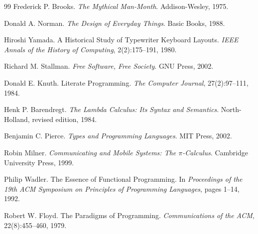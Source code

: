 \documentclass[11pt]{article}
\theoremstyle{definition}
\begin{document}
\begin{thebibliography}{99}
Frederick P. Brooks.
\newblock \emph{The Mythical Man-Month}.
\newblock Addison-Wesley, 1975.

Donald A. Norman.
\newblock \emph{The Design of Everyday Things}.
\newblock Basic Books, 1988.

Hiroshi Yamada.
\newblock A Historical Study of Typewriter Keyboard Layouts.
\newblock \emph{IEEE Annals of the History of Computing}, 2(2):175--191, 1980.

Richard M. Stallman.
\newblock \emph{Free Software, Free Society}.
\newblock GNU Press, 2002.

Donald E. Knuth.
\newblock Literate Programming.
\newblock \emph{The Computer Journal}, 27(2):97--111, 1984.

Henk P. Barendregt.
\newblock \emph{The Lambda Calculus: Its Syntax and Semantics}.
\newblock North-Holland, revised edition, 1984.

Benjamin C. Pierce.
\newblock \emph{Types and Programming Languages}.
\newblock MIT Press, 2002.

Robin Milner.
\newblock \emph{Communicating and Mobile Systems: The $\pi$-Calculus}.
\newblock Cambridge University Press, 1999.

Philip Wadler.
\newblock The Essence of Functional Programming.
\newblock In \emph{Proceedings of the 19th ACM Symposium on Principles of
  Programming Languages}, pages 1--14, 1992.

Robert W. Floyd.
\newblock The Paradigms of Programming.
\newblock \emph{Communications of the ACM}, 22(8):455--460, 1979.

\end{thebibliography}
\end{document}
